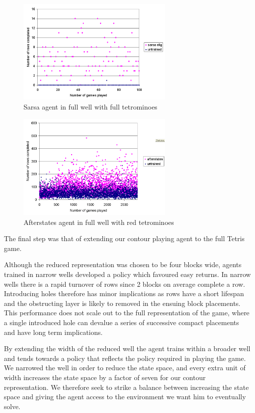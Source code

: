 \documentclass{rucsthesis}
\begin{document}
\begin{figure}[h]
\centering
\includegraphics[width=3in]{sarsaeligfulltetfullwell.png}
\caption{Sarsa agent in full well with full tetrominoes}
\label{fig:sarsaeligfulltetfullwell}
\end{figure}

\begin{figure}[h]
\centering
\includegraphics[width=3in]{afterstatesheightredtetfullwell.png}
\caption{Afterstates agent in full well with red tetrominoes}
\label{fig:afterstatesheightredtetfullwell}
\end{figure}

The final step was that of extending our contour playing agent to the full Tetris game.

Although the reduced representation was chosen to be four blocks wide, agents trained in narrow wells developed a policy which favoured easy returns. In narrow wells there is a rapid turnover of rows since 2 blocks on average complete a row. Introducing holes therefore has minor implications as rows have a short lifespan and the obstructing layer is likely to removed in the ensuing block placements. This performance does not scale out to the full representation of the game, where a single introduced hole can devalue a series of successive compact placements and have long term implications.

By extending the width of the reduced well the agent trains within a broader well and tends towards a policy that reflects the policy required in playing the game. We narrowed the well in order to reduce the state space, and every extra unit of width increases the state space by a factor of seven for our contour representation. We therefore seek to strike a balance between increasing the state space and giving the agent access to the environment we want him to eventually solve.
\end{document}
